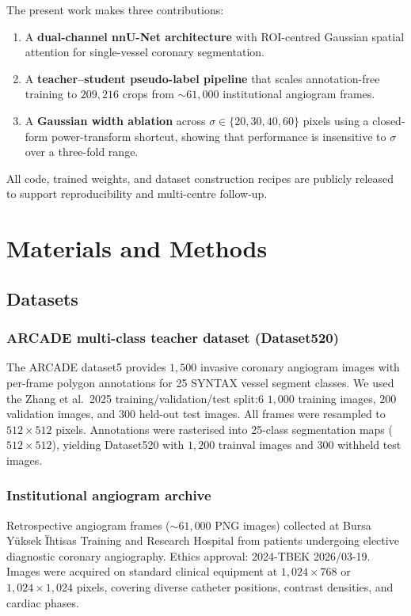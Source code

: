 \documentclass[12pt]{article}
\begin{document}
The present work makes three contributions:
\begin{enumerate}
  \item A \textbf{dual-channel nnU-Net architecture} with ROI-centred
  Gaussian spatial attention for single-vessel coronary segmentation.
  \item A \textbf{teacher–student pseudo-label pipeline} that scales
  annotation-free training to $209{,}216$ crops from ${\sim}61{,}000$
  institutional angiogram frames.
  \item A \textbf{Gaussian width ablation} across $\sigma \in \{20, 30,
  40, 60\}$ pixels using a closed-form power-transform shortcut, showing
  that performance is insensitive to $\sigma$ over a three-fold range.
\end{enumerate}
All code, trained weights, and dataset construction recipes are publicly
released to support reproducibility and multi-centre follow-up.

\section{Materials and Methods}

\subsection{Datasets}

\subsubsection{ARCADE multi-class teacher dataset (Dataset520)}

The ARCADE dataset5 provides $1{,}500$ invasive coronary angiogram images with
per-frame polygon annotations for 25 SYNTAX vessel segment classes. We used the
Zhang et al.\ 2025 training/validation/test split:6 $1{,}000$ training images,
$200$ validation images, and $300$ held-out test images. All frames were
resampled to $512\times512$ pixels. Annotations were rasterised into 25-class
segmentation maps ($512\times512$), yielding Dataset520 with $1{,}200$
trainval images and $300$ withheld test images.

\subsubsection{Institutional angiogram archive}

Retrospective angiogram frames (${\sim}61{,}000$ PNG images) collected at
Bursa Y\"{u}ksek \"{I}htisas Training and Research Hospital from patients
undergoing elective diagnostic coronary angiography. Ethics approval:
2024-TBEK 2026/03-19. Images were acquired on standard clinical equipment
at $1{,}024\times768$ or $1{,}024\times1{,}024$ pixels, covering diverse
catheter positions, contrast densities, and cardiac phases.
\end{document}
